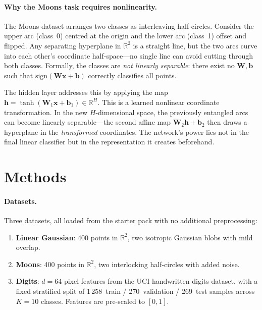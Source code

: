 \documentclass[11pt]{article}
\newcommand{\R}{\mathbb{R}}
\newcommand{\bx}{\mathbf{x}}
\newcommand{\bW}{\mathbf{W}}
\newcommand{\bb}{\mathbf{b}}
\newcommand{\bh}{\mathbf{h}}
\begin{document}
\paragraph{Why the Moons task requires nonlinearity.}
The Moons dataset arranges two classes as interleaving half-circles.  Consider the upper arc
(class~0) centred at the origin and the lower arc (class~1) offset and flipped.  Any
separating hyperplane in $\R^2$ is a straight line, but the two arcs curve into each other's
coordinate half-space---no single line can avoid cutting through both classes.  Formally, the
classes are \emph{not linearly separable}: there exist no $\bW,\bb$ such that
$\mathrm{sign}(\bW\bx+\bb)$ correctly classifies all points.

The hidden layer addresses this by applying the map
$\bh = \tanh(\bW_1\bx + \bb_1) \in \R^H$.  This is a learned nonlinear coordinate
transformation.  In the new $H$-dimensional space, the previously entangled arcs can become
linearly separable---the second affine map $\bW_2\bh + \bb_2$ then draws a hyperplane in the
\emph{transformed} coordinates.  The network's power lies not in the final linear
classifier but in the representation it creates beforehand.

\section{Methods}
\label{sec:methods}

\paragraph{Datasets.}
Three datasets, all loaded from the starter pack with no additional preprocessing:
\begin{enumerate}[label=\arabic*.,leftmargin=2em,itemsep=0.15em]
  \item \textbf{Linear Gaussian}: 400 points in $\R^2$, two isotropic Gaussian blobs
        with mild overlap.
  \item \textbf{Moons}: 400 points in $\R^2$, two interlocking half-circles with
        added noise.
  \item \textbf{Digits}: $d{=}64$ pixel features from the UCI handwritten digits dataset,
        with a fixed stratified split of 1\,258~train / 270~validation / 269~test samples
        across $K{=}10$ classes.  Features are pre-scaled to $[0,1]$.
\end{enumerate}
\end{document}
